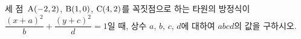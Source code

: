 세 점~$\mathrm{A}(-2{,}\mkern3mu\mathopen{}2)$, $\mathrm{B}(1{,}\mkern3mu\mathopen{}0)$, $\mathrm{C}(4{,}\mkern3mu\mathopen{}2)$를 꼭짓점으로 하는 타원의 방정식이 $\dfrac{(x+a)^2}{b}+\dfrac{(y+c)^2}{d}=1$일 때, 상수 $a$, $b$, $c$, $d$에 대하여 $abcd$의 값을 구하시오.
